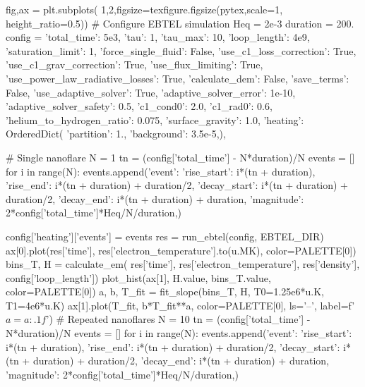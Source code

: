 \begin{pycode}
fig,ax = plt.subplots(
    1,2,figsize=texfigure.figsize(pytex,scale=1, height_ratio=0.5))
# Configure EBTEL simulation
Heq = 2e-3
duration = 200.
config = {
    'total_time': 5e3,
    'tau': 1,
    'tau_max': 10,
    'loop_length': 4e9,
    'saturation_limit': 1,
    'force_single_fluid': False,
    'use_c1_loss_correction': True,
    'use_c1_grav_correction': True,
    'use_flux_limiting': True,
    'use_power_law_radiative_losses': True,
    'calculate_dem': False,
    'save_terms': False,
    'use_adaptive_solver': True,
    'adaptive_solver_error': 1e-10,
    'adaptive_solver_safety': 0.5,
    'c1_cond0': 2.0,
    'c1_rad0': 0.6,
    'helium_to_hydrogen_ratio': 0.075,
    'surface_gravity': 1.0,
    'heating': OrderedDict({
        'partition': 1.,
        'background': 3.5e-5,}),
}

# Single nanoflare
N = 1
tn = (config['total_time'] - N*duration)/N
events = []
for i in range(N):
    events.append({'event':{
        'rise_start': i*(tn + duration),
        'rise_end': i*(tn + duration) + duration/2,
        'decay_start': i*(tn + duration) + duration/2,
        'decay_end': i*(tn + duration) + duration,
        'magnitude': 2*config['total_time']*Heq/N/duration,}})

config['heating']['events'] = events
res = run_ebtel(config, EBTEL_DIR)
ax[0].plot(res['time'], res['electron_temperature'].to(u.MK), color=PALETTE[0])
bins_T, H = calculate_em(
    res['time'], res['electron_temperature'], res['density'], config['loop_length'])
plot_hist(ax[1], H.value, bins_T.value, color=PALETTE[0])
a, b, T_fit = fit_slope(bins_T, H, T0=1.25e6*u.K, T1=4e6*u.K)
ax[1].plot(T_fit, b*T_fit**a, color=PALETTE[0], ls='--', label=f'$a={a:.1f}$')
# Repeated nanoflares
N = 10
tn = (config['total_time'] - N*duration)/N
events = []
for i in range(N):
    events.append({'event':{
        'rise_start': i*(tn + duration),
        'rise_end': i*(tn + duration) + duration/2,
        'decay_start': i*(tn + duration) + duration/2,
        'decay_end': i*(tn + duration) + duration,
        'magnitude': 2*config['total_time']*Heq/N/duration,}})


\end{pycode}
